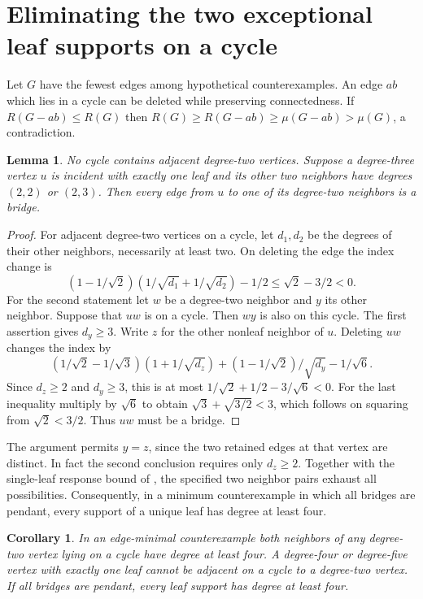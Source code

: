 \documentclass[11pt,a4paper]{article}
\newtheorem{lemma}[theorem]{Lemma}\newtheorem{corollary}[theorem]{Corollary}
\begin{document}
\section{Eliminating the two exceptional leaf supports on a cycle}
Let $G$ have the fewest edges among hypothetical counterexamples.
An edge $ab$ which lies in a cycle can be deleted while preserving
connectedness. If $R(G-ab)\le R(G)$ then
$R(G)\ge R(G-ab)\ge\mu(G-ab)>\mu(G)$, a contradiction.
\begin{lemma}\label{p09-lem:cyc23support}
No cycle contains adjacent degree-two vertices. Suppose a degree-three
vertex $u$ is incident with exactly one leaf and its other two neighbors
have degrees $(2,2)$ or $(2,3)$. Then every edge from $u$ to one of its
degree-two neighbors is a bridge.
\end{lemma}
\begin{proof}
For adjacent degree-two vertices on a cycle, let $d_1,d_2$ be the
degrees of their other neighbors, necessarily at least two. On deleting
the edge the index change is
\[
 (1-1/\sqrt2)(1/\sqrt{d_1}+1/\sqrt{d_2})-1/2
 \le\sqrt2-3/2<0 .
\]
For the second statement let $w$ be a degree-two neighbor and $y$ its
other neighbor. Suppose that $uw$ is on a cycle. Then $wy$ is also
on this cycle. The first assertion gives $d_y\ge3$.
Write $z$ for the other nonleaf neighbor of $u$.
Deleting $uw$ changes the index by
\[
 (1/\sqrt2-1/\sqrt3)(1+1/\sqrt{d_z})
 +(1-1/\sqrt2)/\sqrt{d_y}-1/\sqrt6 .
\]
Since $d_z\ge2$ and $d_y\ge3$, this is at most
$1/\sqrt2+1/2-3/\sqrt6<0$.
For the last inequality multiply by $\sqrt6$ to obtain
$\sqrt3+\sqrt{3/2}<3$, which follows on squaring from
$\sqrt2<3/2$. Thus $uw$ must be a bridge.
\end{proof}
The argument permits $y=z$, since the two retained edges at that
vertex are distinct. In fact the second conclusion requires only
$d_z\ge2$. Together with the single-leaf response bound of \cite[Corollary 2.2]{p09-Prev}, the specified two neighbor pairs exhaust all possibilities.
Consequently, in a minimum counterexample in which all bridges are
pendant, every support of a unique leaf has degree at least four.
\begin{corollary}
In an edge-minimal counterexample both neighbors of any degree-two
vertex lying on a cycle have degree at least four. A degree-four or
degree-five vertex with exactly one leaf cannot be adjacent on a
cycle to a degree-two vertex. If all bridges are pendant, every leaf
support has degree at least four.
\end{corollary}
\end{document}
